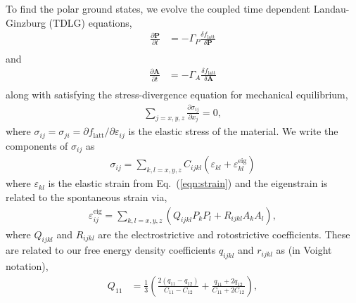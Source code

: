 \documentclass[%
 reprint,
superscriptaddress,
 amsmath,amssymb,
prb,
]{revtex4-1}
\begin{document}
To find the polar ground states, we evolve the coupled time dependent Landau-Ginzburg (TDLG) equations,
%
\begin{equation}\label{eqn:TDLG_P}
\begin{aligned}
\frac{\partial \mathbf{P}}{\partial t} &= - \Gamma_P \frac{\delta f_\mathrm{latt}}{\delta \mathbf{P}} \\
\end{aligned}
\end{equation}
%
and
%
\begin{equation}\label{eqn:TDLG_A}
\begin{aligned}
\frac{\partial \mathbf{A}}{\partial t} &= - \Gamma_A \frac{\delta f_\mathrm{latt}}{\delta \mathbf{A}} \\
\end{aligned}
\end{equation}
%
along with satisfying the stress-divergence equation for mechanical equilibrium,
%
\begin{align}\label{eqn:stress-div}
\sum\limits_{j = x,y,z}\frac{\partial \sigma_{ij}}{\partial x_j} = 0,
\end{align}
%
where $\sigma_{ij} = \sigma_{ji} = \partial f_\mathrm{latt} / \partial \varepsilon_{ij}$ is the elastic stress of the material.
%
%
We write the components of $\sigma_{ij}$ as 
%
\begin{align}\label{eqn:totalstress}
\sigma_{ij} = \sum\limits_{k,l = x,y,z} C_{ijkl} \left(\varepsilon_{kl} + \varepsilon_{kl}^\mathrm{eig}\right)
\end{align}
%
where $\varepsilon_{kl}$ is the elastic strain from Eq.~(\ref{eqn:strain}) and the eigenstrain is related to the spontaneous strain via,
%
\begin{align}\label{eqn:eigenstrain}
\varepsilon_{ij}^\mathrm{eig} = \sum\limits_{k,l = x,y,z} \left(Q_{ijkl} P_k P_l + R_{ijkl} A_k A_l\right),
\end{align}
%
where $Q_{ijkl}$ and $R_{ijkl}$ are the electrostrictive and rotostrictive coefficients.
%
These are related to our free energy density coefficients $q_{ijkl}$ and $r_{ijkl}$ as (in Voight notation),
%
\begin{equation}\label{eqn:eig1}
\begin{aligned}
Q_{11} &= \frac{1}{3} \left(\frac{2\left(q_{11} - q_{12}\right)}{C_{11} - C_{12}} + \frac{q_{11} + 2 q_{12}}{C_{11}+2 C_{12}}\right), \\ 
\end{aligned}
\end{equation}
\end{document}
